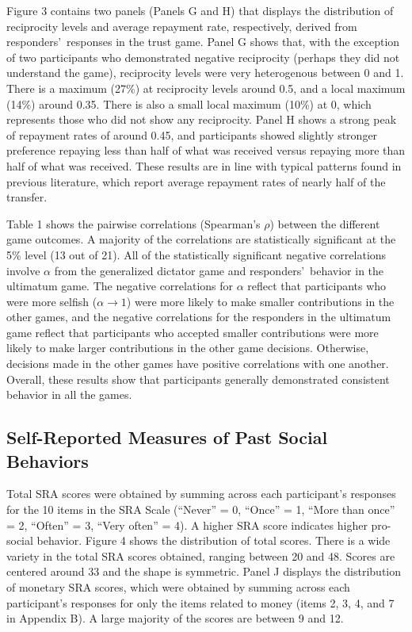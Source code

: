 \documentclass[12pt]{article}
\begin{document}
Figure 3 contains two panels (Panels G and H) that displays the distribution of reciprocity levels and average repayment rate, respectively, derived from responders\rq \ responses in the trust game. Panel G shows that, with the exception of two participants who demonstrated negative reciprocity (perhaps they did not understand the game), reciprocity levels were very heterogenous between 0 and 1. There is a maximum (27\%) at reciprocity levels around 0.5, and a local maximum (14\%) around 0.35. There is also a small local maximum (10\%) at 0, which represents those who did not show any reciprocity. Panel H shows a strong peak of repayment rates of around 0.45, and participants showed slightly stronger preference repaying less than half of what was received versus repaying more than half of what was received. These results are in line with typical patterns found in previous literature, which report average repayment rates of nearly half of the transfer.

Table 1 shows the pairwise correlations (Spearman\rq s \(\rho\)) between the different game outcomes. A majority of the correlations are statistically significant at the 5\% level (13 out of 21). All of the statistically significant negative correlations involve \(\alpha\) from the generalized dictator game and responders\rq \ behavior in the ultimatum game. The negative correlations for \(\alpha\) reflect that participants who were more selfish (\(\alpha \rightarrow 1\)) were more likely to make smaller contributions in the other games, and the negative correlations for the responders in the ultimatum game reflect that participants who accepted smaller contributions were more likely to make larger contributions in the other game decisions. Otherwise, decisions made in the other games have positive correlations with one another. Overall, these results show that participants generally demonstrated consistent behavior in all the games.

\subsection{Self-Reported Measures of Past Social Behaviors}

Total SRA scores were obtained by summing across each participant\rq s responses for the 10 items in the SRA Scale (``Never'' = 0, ``Once'' = 1, ``More than once'' = 2, ``Often'' = 3, ``Very often'' = 4). A higher SRA score indicates higher pro-social behavior. Figure 4 shows the distribution of total scores. There is a wide variety in the total SRA scores obtained, ranging between 20 and 48. Scores are centered around 33 and the shape is symmetric. Panel J displays the distribution of monetary SRA scores, which were obtained by summing across each participant\rq s responses for only the items related to money (items 2, 3, 4, and 7 in Appendix B).  A large majority of the scores are between 9 and 12.
\end{document}
